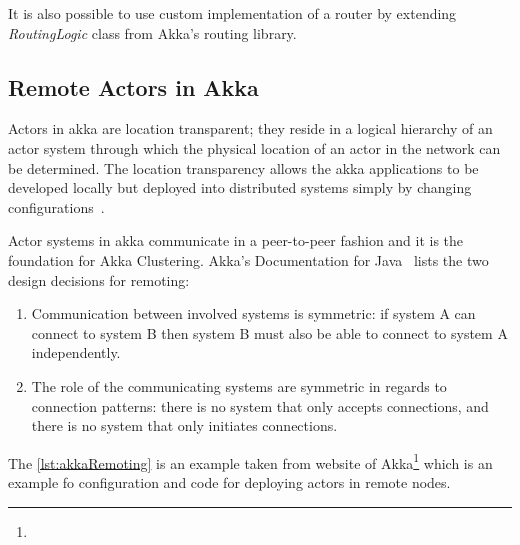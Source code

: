 It is also possible to use custom implementation of a router by extending \emph{RoutingLogic} class from Akka's routing library.

  \subsection{Remote Actors in Akka}
  Actors in akka are location transparent; they reside in a logical hierarchy of an actor system through which the physical location of an actor in the network can be determined. The location transparency allows the akka applications to be developed locally but deployed into distributed systems simply by changing configurations~\cite{akkaJavaDoc}.

  Actor systems in akka communicate in a peer-to-peer fashion and it is the foundation for Akka Clustering. Akka's Documentation for Java~\cite{akkaJavaDoc} lists the two design decisions for remoting:
\begin{enumerate}

  \item Communication between involved systems is symmetric: if system A can connect to system B then system B must also be able to connect to system A independently.

  \item The role of the communicating systems are symmetric in regards to connection patterns: there is no system that only accepts connections, and there is no system that only initiates connections.
\end{enumerate}

The \autoref{lst:akkaRemoting} is an example taken from website of Akka\footnote{} which is an example fo configuration and code for deploying actors in remote nodes.

